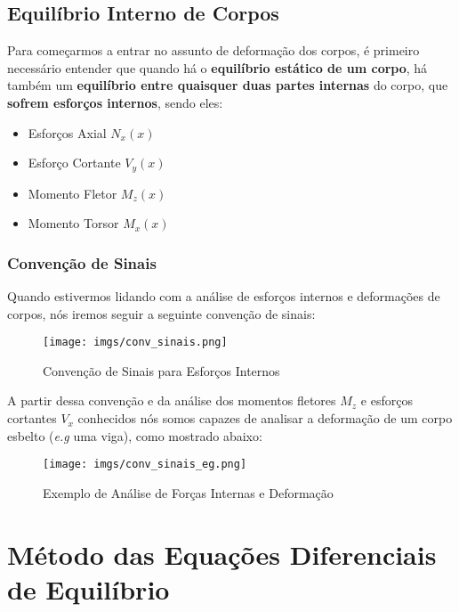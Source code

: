 \documentclass{article}
\begin{document}
        \newpage
        \subsection{Equilíbrio Interno de Corpos}
            Para começarmos a entrar no assunto de deformação dos corpos, é primeiro necessário entender que quando há o \textbf{equilíbrio estático de um corpo}, há também um \textbf{equilíbrio entre quaisquer duas
            partes internas} do corpo, que \textbf{sofrem esforços internos}, sendo eles:
            \begin{itemize}
                \item Esforços Axial $N_x(x)$
                \item Esforço Cortante $V_y(x)$
                \item Momento Fletor $M_z(x)$
                \item Momento Torsor $M_x(x)$
            \end{itemize}

            \subsubsection{Convenção de Sinais}
                Quando estivermos lidando com a análise de esforços internos e deformações de corpos, nós iremos seguir a seguinte convenção de sinais:
                \begin{figure}[h]
                    \centering
                    \texttt{[image: imgs/conv\_sinais.png]}
                    \caption{Convenção de Sinais para Esforços Internos}
                \end{figure}


                A partir dessa convenção e da análise dos momentos fletores $M_z$ e esforços cortantes $V_x$ conhecidos nós somos capazes de analisar a deformação de um corpo esbelto (\emph{e.g} uma viga),
                como mostrado abaixo:
                \begin{figure}[h]
                    \centering
                    \texttt{[image: imgs/conv\_sinais\_eg.png]}
                    \caption{Exemplo de Análise de Forças Internas e Deformação}
                \end{figure}

        \section{Método das Equações Diferenciais de Equilíbrio}
\end{document}
